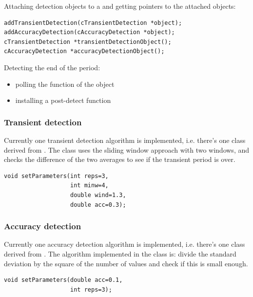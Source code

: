 %
%

Attaching detection objects to a  and getting pointers
to the attached objects:

\begin{verbatim}
addTransientDetection(cTransientDetection *object);
addAccuracyDetection(cAccuracyDetection *object);
cTransientDetection *transientDetectionObject();
cAccuracyDetection *accuracyDetectionObject();
\end{verbatim}


Detecting the end of the period:
\begin{itemize}
\item{polling the  function of the object}
\item{installing a post-detect function}
\end{itemize}


\subsubsection{Transient detection}


Currently one transient detection algorithm
is implemented, i.e.  there's one class derived from
. The  class
uses the sliding window approach with two windows, and checks the
difference of the two averages to see if the transient period is over.

\begin{verbatim}
void setParameters(int reps=3,
                   int minw=4,
                   double wind=1.3,
                   double acc=0.3);
\end{verbatim}

\subsubsection{Accuracy detection}


Currently one accuracy detection algorithm
is implemented, i.e.  there's one class derived from
. The algorithm implemented in the
 class is: divide the standard deviation by the
square of the number of values and check if this is small enough.

\begin{verbatim}
void setParameters(double acc=0.1,
                   int reps=3);
\end{verbatim}




